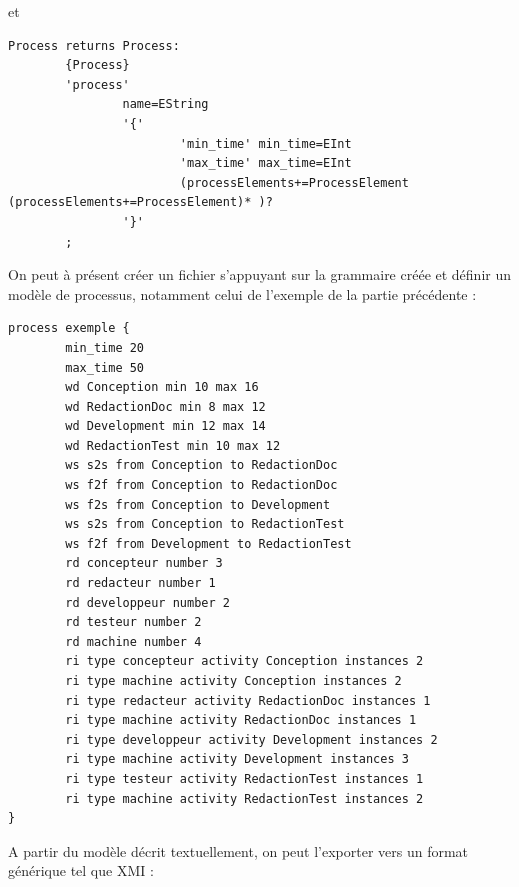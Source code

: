 \documentclass{report}
\begin{document}
et

\begin{verbatim}
Process returns Process:
        {Process}
        'process'
                name=EString
                '{'
                        'min_time' min_time=EInt
                        'max_time' max_time=EInt
                        (processElements+=ProcessElement (processElements+=ProcessElement)* )?
                '}'
        ;
\end{verbatim}

On peut à présent créer un fichier s'appuyant sur la grammaire créée et définir un modèle de processus, notamment celui de l'exemple de la partie précédente :

\begin{verbatim}
process exemple {
        min_time 20
        max_time 50
        wd Conception min 10 max 16
        wd RedactionDoc min 8 max 12
        wd Development min 12 max 14
        wd RedactionTest min 10 max 12
        ws s2s from Conception to RedactionDoc
        ws f2f from Conception to RedactionDoc
        ws f2s from Conception to Development
        ws s2s from Conception to RedactionTest
        ws f2f from Development to RedactionTest
        rd concepteur number 3
        rd redacteur number 1
        rd developpeur number 2
        rd testeur number 2
        rd machine number 4
        ri type concepteur activity Conception instances 2
        ri type machine activity Conception instances 2
        ri type redacteur activity RedactionDoc instances 1
        ri type machine activity RedactionDoc instances 1
        ri type developpeur activity Development instances 2
        ri type machine activity Development instances 3
        ri type testeur activity RedactionTest instances 1
        ri type machine activity RedactionTest instances 2
}
\end{verbatim}

A partir du modèle décrit textuellement, on peut l'exporter vers un format générique tel que XMI :
\end{document}
